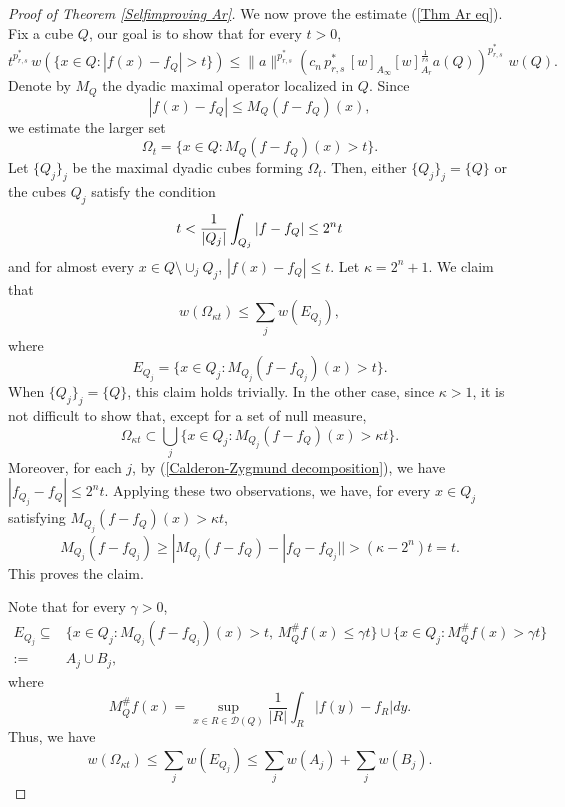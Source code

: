 \documentclass[reqno, 10pt, oneside]{amsart}
\numberwithin{equation}{section}
\numberwithin{theorem}{section}
\newcommand{\1}{{\rm 1\hspace*{-0.4ex}%
\rule{0.1ex}{1.52ex}\hspace*{0.2ex}}}
\begin{document}
\begin{proof}[Proof of Theorem \ref{Selfimproving Ar}]
We now prove the estimate (\ref{Thm Ar eq}). Fix a cube $Q$, our goal is to show that for every $t>0$,
\begin{equation}\label{displayThm Ar eq}
t^{p_{r,s}^{*}} \, w(\{x\in Q: |f(x)-f_Q|>t\})\leq  \|a\|^{p_{r,s}^{*}} (c_n \, p_{r,s}^{*}\, [w]_{A_\infty} [w]_{A_r}^{\frac{1}{rs}} a(Q))^{p_{r,s}^{*}}\,  \, w(Q).
\end{equation}
Denote by $M_Q$ the dyadic maximal operator localized in $Q$. Since 
\begin{equation*}
	|f(x)-f_Q| \leq M_Q (f-f_Q)(x),
\end{equation*}
we estimate the larger set 
\begin{equation*}
	\Omega_t = \{x\in Q: M_Q(f-f_Q)(x)>t\}.
\end{equation*} 
Let $\{Q_j\}_j$ be the maximal dyadic cubes forming $\Omega_t$. Then, either $\{Q_j\}_j =\{Q\}$ or the cubes $Q_j$ satisfy the condition
\begin{equation}{\label{Calderon-Zygmund decomposition}}
t < \frac{1}{|Q_j|}\int_{Q_j} {|f-f_Q|} \leq 2^n t    
\end{equation}
and for almost every $x \in Q \setminus \cup_j Q_j$, $|f(x)-f_Q| \le t$. Let $\kappa=2^n+1$. We claim that 
\begin{equation*}
	w(\Omega_{\kappa t}) \leq \sum_j w(E_{Q_j}),
\end{equation*}
where
\begin{equation*}
	E_{Q_j}= \{ x\in Q_j: M_{Q_j}(f-f_{Q_j})(x)>t\}.
\end{equation*} 
When $\{Q_j\}_j =\{Q\}$, this claim holds trivially. In the other case, since $\kappa > 1$, it is not difficult to show that, except for a set of null measure,
\begin{equation*}
	\Omega_{\kappa t} \subset \bigcup_{j}\{x \in Q_j : M_{Q_j}(f-f_Q)(x) > \kappa t\}.
\end{equation*}
Moreover, for each $j$, by (\ref{Calderon-Zygmund decomposition}), we have $|f_{Q_j} - f_Q| \le 2^n t$. Applying these two observations, we have, for every $x \in Q_j$ satisfying $M_{Q_j}(f-f_Q)(x) > \kappa t$, 
\begin{equation*}
	M_{Q_j}(f-f_{Q_j}) \ge |M_{Q_j}(f-f_{Q})-|f_Q-f_{Q_j}|| > (\kappa-2^n)t =  t.
\end{equation*}
This proves the claim. 


Note that for every $\gamma >0$,
\begin{align*}
E_{Q_j}  \subseteq & \{x\in Q_j : M_{Q_j}(f-f_{Q_j})(x)>t, \, M_{Q}^\# f (x) \leq \gamma t\}  \cup \{ x\in Q_j :   M_{Q}^\# f (x) > \gamma t\} \\
 :=&  A_j \cup B_j,
\end{align*}
where 
\begin{equation*}
	M_{Q}^\# f (x) = \sup_{x\in R\in \mathcal{D}(Q)} \frac{1}{|R|}\int_R |f(y)-f_R|dy.
\end{equation*}
Thus, we have 
\begin{equation*}
	w(\Omega_{\kappa t}) \leq \sum_j w(E_{Q_j}) \leq \sum_j w(A_j) + \sum_j w(B_j).
\end{equation*}


\end{proof}
\end{document}
